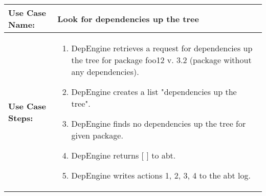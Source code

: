 \newpage
\begin{tabularx}{\linewidth}{|l|X|}
\hline
\textbf{Use Case Name:} & \textbf{Look for dependencies up the tree} \\
\hline
\textbf{Use Case Steps:} & 
\begin{minipage}{\linewidth} 
 \vspace{0.05em}
  \begin{enumerate}
   \item DepEngine retrieves a request for dependencies up the tree for package foo12 v. 3.2 (package without any dependencies).
   \item DepEngine creates a list "dependencies up the tree".
   \item DepEngine finds no dependencies up the tree for given package.   
   \item DepEngine returns [ ] to abt.
   \item DepEngine writes actions 1, 2, 3, 4 to the abt log.
  \end{enumerate}
 \vspace{0.05em}
\end{minipage}
\\
\hline 
\end{tabularx}
